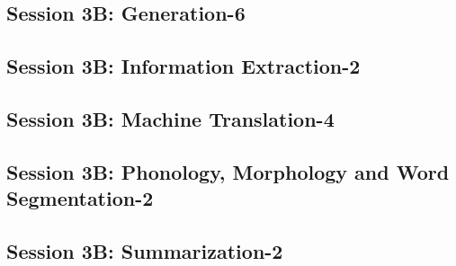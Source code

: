 \subsection{\large Session 3B: Generation-6}
\label{parallel-session-3B-trackC}
\TrackCLoc\hfill\sessionchair{}{}
\clearpage
\subsection{\large Session 3B: Information Extraction-2}
\label{parallel-session-3B-trackD}
\TrackDLoc\hfill\sessionchair{}{}
\clearpage
\subsection{\large Session 3B: Machine Translation-4}
\label{parallel-session-3B-trackE}
\TrackELoc\hfill\sessionchair{}{}
\clearpage
\subsection{\large Session 3B: Phonology, Morphology and Word Segmentation-2}
\label{parallel-session-3B-trackF}
\TrackFLoc\hfill\sessionchair{}{}
\clearpage
\subsection{\large Session 3B: Summarization-2}
\label{parallel-session-3B-trackG}
\TrackGLoc\hfill\sessionchair{}{}
\clearpage


